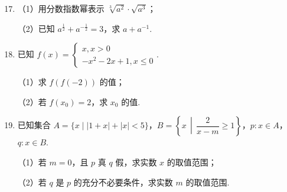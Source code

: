 \documentclass[a4paper,11pt]{article}
\begin{document}

\begin{enumerate}
\setcounter{enumi}{16}

\item （1）用分数指数幂表示 $\sqrt[3]{a^2}\cdot\sqrt{a^3}$；

（2）已知 $a^{\frac12}+a^{-\frac12}=3$，求 $a+a^{-1}$.

\ifanswer
\solbegin
{}
\solend
\fi

\item 已知 $f(x)=\begin{cases}x,x>0\\-x^2-2x+1,x\leqslant0\end{cases}$.

（1）求 $f(f(-2))$ 的值；

（2）若 $f(x_0)=2$，求 $x_0$ 的值.

\ifanswer
\solbegin
{}
\solend
\fi

\item 已知集合 $A=\{x\mid\lvert 1+x\rvert+\lvert x\rvert<5\}$，$B=\left\{x\,\middle\vert\,\dfrac2{x-m}\geqslant1\right\}$，$p:x\in A$，$q:x\in B$.

（1）若 $m=0$，且 $p$ 真 $q$ 假，求实数 $x$ 的取值范围；

（2）若 $q$ 是 $p$ 的充分不必要条件，求实数 $m$ 的取值范围.


\end{enumerate}
\end{document}
